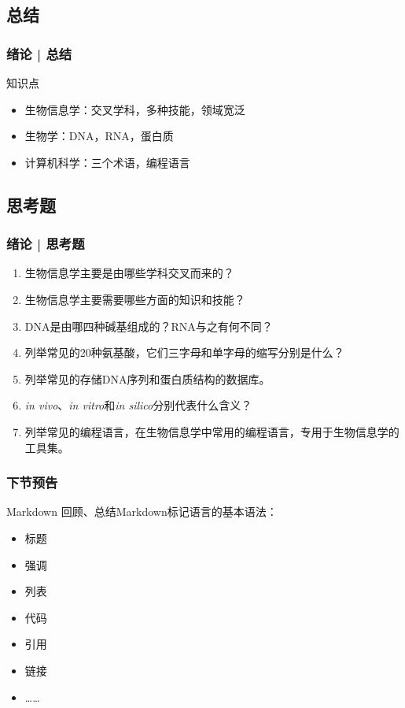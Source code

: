 \subsection{总结}
\begin{frame}
  \frametitle{绪论 | 总结}
  \begin{block}{知识点}
    \begin{itemize}
      \item 生物信息学：交叉学科，多种技能，领域宽泛
      \item 生物学：DNA，RNA，蛋白质
      \item 计算机科学：三个术语，编程语言
    \end{itemize}
  \end{block}
\end{frame}

\subsection{思考题}
\begin{frame}
  \frametitle{绪论 | 思考题}
  \begin{enumerate}
    \item 生物信息学主要是由哪些学科交叉而来的？
    \item 生物信息学主要需要哪些方面的知识和技能？
    \item DNA是由哪四种碱基组成的？RNA与之有何不同？
    \item 列举常见的20种氨基酸，它们三字母和单字母的缩写分别是什么？
    \item 列举常见的存储DNA序列和蛋白质结构的数据库。
    \item \textit{in vivo}、\textit{in vitro}和\textit{in silico}分别代表什么含义？
    \item 列举常见的编程语言，在生物信息学中常用的编程语言，专用于生物信息学的工具集。
  \end{enumerate}
\end{frame}

\begin{frame}
  \frametitle{下节预告}
  \begin{block}{Markdown}
    回顾、总结Markdown标记语言的基本语法：
    \begin{itemize}
      \item 标题
      \item 强调
      \item 列表
      \item 代码
      \item 引用
      \item 链接
      \item ……
    \end{itemize}
  \end{block}
\end{frame}


